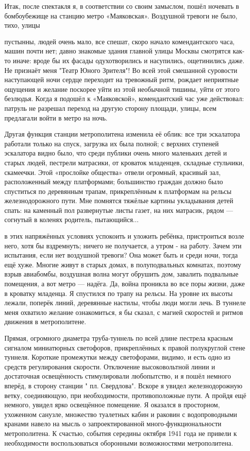 Итак, после спектакля я, в соответствии со своим замыслом, пошёл ночевать в бомбоубежище на станцию метро «Маяковская». Воздушной тревоги не было, тихо, улицы

\label{236-1}
пустынны, людей очень мало, все спешат, скоро начало комендантского часа, машин почти нет; давно знакомые здания главной улицы Москвы смотрятся как-то иначе: вроде бы их фасады одухотворились и насупились, ощетинились даже. Не признаёт меня "Театр Юного Зрителя"! Во всей этой смешанной суровости наступающей ночи сердце переходит на тревожный ритм, рождает неприятные ощущения и желание поскорее уйти из этой необычной тишины, уйти от этого безлюдья. Когда я подошёл к «Маяковской», комендантский час уже действовал: патруль не разрешал переход на другую сторону площади, улицы, всем предлагали войти в метро на ночь.

\label{237-1}
Другая функция станции метрополитена изменила её облик: все три эскалатора работали только на спуск, загрузка их была полной; с верхних ступеней эскалатора видно было, что среди публики очень много маленьких детей и старых людей, пестрели матрасики, от кроваток младенцев, складные стульчики, скамеечки. Этой «прослойке общества» отвели огромный, красивый зал, расположенный между платформами; большинство граждан должно было спуститься по деревянным трапам, прикреплённым к платформам на рельсы железнодорожного пути. Мне помнятся тяжёлые картины укладывания детей спать: на каменный пол развернутые листы газет, на них матрасик, рядом — согнутый в коленях родитель, пытающийся...

\label{238-1}
в этих напряжённых условиях успокоить и уложить ребёнка, пристроиться возле него, хотя бы вздремнуть; ничего не получается, а утром - на работу. Зачем эти испытания, если нет воздушной тревоги? Она может быть и среди ночи, тогда ещё хуже. Многие живут в старых домах, в полуподвальных комнатах, поэтому взрыв авиабомбы, воздушная волна могут обрушить дом, завалить подвальные помещения, а вот метро — надёга. Да, война проникла во все поры жизни, даже в кроватку младенца. Я спустился по трапу на рельсы. На уровне их высоты лежали, поперёк линий, деревянные настилы, чтобы люди могли лечь. В туннеле меня охватило желание ознакомиться, я бы сказал, с магией скоростей и ритмов движения в метрополитене.

\label{239-1}
Прямая, огромного диаметра труба-туннель по всей длине пестрела красным сигналом миниатюрных светофоров, прикреплённых к правой полукруглой стене туннеля. Короткие промежутки между светофорами, видимо, и есть одно из средств регулирования скорости. Отключение высоковольтной линии и достаточная освещённость стимулировали любопытство, и я пошёл немного вперёд, в сторону станции " пл. Свердлова". Вскоре я увидел железнодорожную ветку, соединяющую, при необходимости, противоположные пути. А пройдя ещё немного, увидел ярко освещённое помещение. Я оказался в просторном, ухоженном санузле, множество туалетных кабин и раковин с водопроводными кранами навело на мысль о запроектированной много-функциональности метрополитена. К счастью, события середины октября 1941 года не привели к необходимости воспользоваться оборонными возможностями метрополитена.

